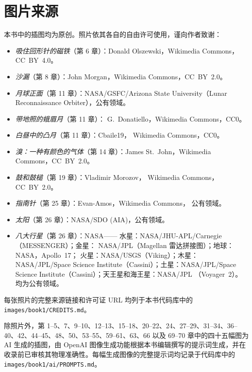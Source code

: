 \chapter*{图片来源}

本书中的插图均为原创。照片依其各自的自由许可使用，谨向作者致谢：

\begin{itemize}
  \item \emph{吸住回形针的磁铁}（第 6 章）：Donald
        Olszewski，Wikimedia Commons，CC~BY~4.0。
  \item \emph{沙漏}（第 8 章）：John Morgan，Wikimedia
        Commons，CC~BY~2.0。
  \item \emph{月球正面}（第 11 章）：NASA/GSFC/Arizona
        State University（Lunar Reconnaissance Orbiter），公有领域。
  \item \emph{带地照的蛾眉月}（第 11 章）：
        G.~Donatiello，Wikimedia Commons，CC0。
  \item \emph{白昼中的凸月}（第 11 章）：Cbaile19，
        Wikimedia Commons，CC0。
  \item \emph{溴：一种有颜色的气体}（第 14 章）：James
        St.~John，Wikimedia Commons，CC~BY~2.0。
  \item \emph{鼓和鼓槌}（第 19 章）：Vladimir Morozov，
        Wikimedia Commons，CC~BY~2.0。
  \item \emph{指南针}（第 25 章）：Evan-Amos，Wikimedia Commons，
        公有领域。
  \item \emph{太阳}（第 26 章）：NASA/SDO (AIA)，公有领域。
  \item \emph{八大行星}（第 26 章）：NASA——
        水星：NASA/JHU-APL/Carnegie（MESSENGER）；金星：
        NASA/JPL（Magellan 雷达拼接图）；地球：NASA，Apollo~17；
        火星：NASA/USGS（Viking）；木星：NASA/JPL/Space Science
        Institute（Cassini）；土星：NASA/JPL/Space Science
        Institute（Cassini）；天王星和海王星：NASA/JPL
        （Voyager~2）。均为公有领域。
\end{itemize}

每张照片的完整来源链接和许可证 URL 均列于本书代码库中的
\texttt{images/book1/CREDITS.md}。

\bigskip
除照片外，第 1--5、7、9--10、12--13、15--18、20--22、24、27--29、31--34、36--40、42、44--45、48、50、53--55、59--61、63、66 以及 69--70 章中的四十五幅图为 AI 生成的插图，由 OpenAI 图像生成功能根据本书编辑撰写的提示词生成，并在收录前已审核其物理准确性。每幅生成图像的完整提示词均记录于代码库中的
\texttt{images/book1/ai/PROMPTS.md}。
\clearpage
